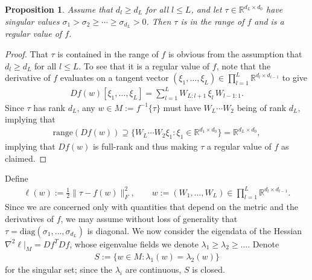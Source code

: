 \documentclass{article}
\newcommand{\RB}{\mathbb{R}}
\theoremstyle{plain}
\newtheorem{proposition}[theorem]{Proposition}
\theoremstyle{definition}
\theoremstyle{remark}
\begin{document}
\begin{proposition}\label{prop:regularvalue}
    Assume that $d_l\geq d_L$ for all $l\leq L$, and let $\tau\in\RB^{d_L\times d_0}$ have singular values $\sigma_1 >\sigma_2\geq\cdots\geq \sigma_{d_L}>0$. Then $\tau$ is in the range of $f$ and is a regular value of $f$.
\end{proposition}

\begin{proof}
    That $\tau$ is contained in the range of $f$ is obvious from the assumption that $d_l\geq d_L$ for all $l\leq L$. To see that it is a regular value of $f$, note that the derivative of $f$ evaluates on a tangent vector $(\xi_1,\dots,\xi_L)\in \prod_{l=1}^L\RB^{d_l\times d_{l-1}}$ to give
    \begin{align}
    Df(w)[\xi_1,\dots,\xi_L] = \sum_{l=1}^LW_{L:l+1}\,\xi_l\,W_{l-1:1}.
    \end{align}
    Since $\tau$ has rank $d_L$, any $w\in M:=f^{-1}\{\tau\}$ must have $W_L\cdots W_2$ being of rank $d_L$, implying that
    \begin{align}
    \mathrm{range}(Df(w))\supseteq \{W_L\cdots W_2\xi_1:\xi_1\in\RB^{d_1\times d_0}\} = \RB^{d_L\times d_0},
    \end{align}
    implying that $Df(w)$ is full-rank and thus making $\tau$ a regular value of $f$ as claimed.
\end{proof}

Define
\begin{align}
\ell(w):=\frac{1}{2}\|\tau-f(w)\|_F^2,\qquad w:=(W_1,\dots,W_L)\in\prod_{l=1}^L\RB^{d_l\times d_{l-1}}.
\end{align}
Since we are concerned only with quantities that depend on the metric and the derivatives of $f$, we may assume without loss of generality that $\tau = \mathrm{diag}(\sigma_1,\dots,\sigma_{d_L})$ is diagonal. We now consider the eigendata of the Hessian $\nabla^2\ell|_M = Df^TDf$, whose eigenvalue fields we denote $\lambda_1\geq\lambda_2\geq\dots$. Denote
\begin{align}
S:=\{w\in M:\lambda_1(w) = \lambda_2(w)\}
\end{align}
for the singular set; since the $\lambda_i$ are continuous, $S$ is closed. 
\end{document}
